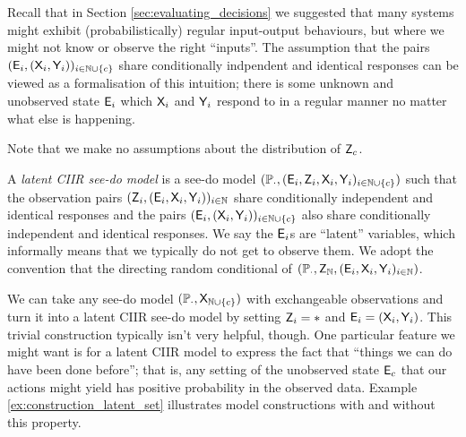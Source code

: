 Recall that in Section \ref{sec:evaluating_decisions} we suggested that many systems might exhibit (probabilistically) regular input-output behaviours, but where we might not know or observe the right ``inputs''. The assumption that the pairs $(\mathsf{E}_i,(\mathsf{X}_i,\mathsf{Y}_i))_{i\in\mathbb{N}\cup\{c\}}$ share conditionally indpendent and identical responses can be viewed as a formalisation of this intuition; there is some unknown and unobserved state $\mathsf{E}_i$ which $\mathsf{X}_i$ and $\mathsf{Y}_i$ respond to in a regular manner no matter what else is happening.

Note that we make no assumptions about the distribution of $\mathsf{Z}_c$.

\begin{definition}
A \emph{latent CIIR see-do model} is a see-do model $(\mathbb{P}_\cdot,(\mathsf{E}_i,\mathsf{Z}_{i},\mathsf{X}_i,\mathsf{Y}_i)_{i\in \mathbb{N}\cup\{c\}})$ such that the observation pairs $(\mathsf{Z}_{i},(\mathsf{E}_i,\mathsf{X}_i,\mathsf{Y}_i))_{i\in \mathbb{N}}$ share conditionally independent and identical responses and the pairs $(\mathsf{E}_i,(\mathsf{X}_i,\mathsf{Y}_i))_{i\in\mathbb{N}\cup\{c\}}$ also share conditionally independent and identical responses. We say the $\mathsf{E}_i$s are ``latent'' variables, which informally means that we typically do not get to observe them. We adopt the convention that the directing random conditional of $(\mathbb{P}_\cdot,\mathsf{Z}_{\mathbb{N}},(\mathsf{E}_i,\mathsf{X}_i,\mathsf{Y}_i)_{i\in \mathbb{N}})$.
\end{definition}

We can take any see-do model $(\mathbb{P}_\cdot,\mathsf{X}_{\mathbb{N}\cup\{c\}})$ with exchangeable observations and turn it into a latent CIIR see-do model by setting $\mathsf{Z}_i=*$ and $\mathsf{E}_i=(\mathsf{X}_i,\mathsf{Y}_i)$. This trivial construction typically isn't very helpful, though. One particular feature we might want is for a latent CIIR model to express the fact that ``things we can do have been done before''; that is, any setting of the unobserved state $\mathsf{E}_c$ that our actions might yield has positive probability in the observed data. Example \ref{ex:construction_latent_set} illustrates model constructions with and without this property.

